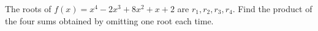 The roots of $f(x)=x^4-2x^3+8x^2+x+2$ are $r_1,r_2,r_3,r_4$. Find the product of the four sums obtained by omitting one root each time.
